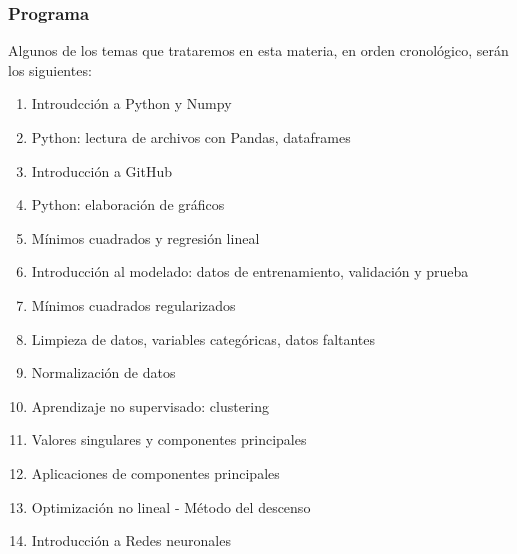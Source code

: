 \documentclass[aspectratio=169,12pt]{beamer}
\begin{document}
\begin{frame}
\frametitle{Programa}

Algunos de los temas que trataremos en esta materia, en orden cronológico, serán los siguientes:

{\scriptsize
\begin{enumerate}
\item Introudcción a Python y Numpy
\item Python: lectura de archivos con Pandas, dataframes
\item Introducción a GitHub
\item Python: elaboración de gráficos
\item Mínimos cuadrados y regresión lineal
\item Introducción al modelado: datos de entrenamiento, validación y prueba
\item Mínimos cuadrados regularizados
\item Limpieza de datos, variables categóricas, datos faltantes
\item Normalización de datos
\item Aprendizaje no supervisado: clustering
\item Valores singulares y componentes principales
\item Aplicaciones de componentes principales
\item Optimización no lineal - Método del descenso
\item Introducción a Redes neuronales
\end{enumerate}
}
\end{frame}

\end{document}
